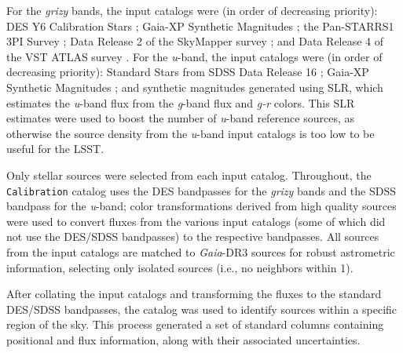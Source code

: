 For the \textit{grizy} bands, the input catalogs were (in order of decreasing priority): \gls{DES} Y6 Calibration Stars \citep{2023arXiv230501695R}; Gaia-\gls{XP} Synthetic Magnitudes \citep{2023A&A...674A..33G}; the \gls{Pan-STARRS}1 3PI Survey \citep{2016arXiv161205560C}; \gls{Data Release} 2 of the  SkyMapper survey \citep{2019PASA...36...33O}; and \gls{Data Release} 4 of the \gls{VST} \gls{ATLAS} survey \citep{2015MNRAS.451.4238S}.
For the \textit{u}-band, the input catalogs were (in order of decreasing priority): Standard Stars from \gls{SDSS} \gls{Data Release} 16 \citep{2020ApJS..249....3A}; Gaia-\gls{XP} Synthetic Magnitudes \citep{2023A&A...674A..33G}; and synthetic magnitudes generated using \gls{SLR}, which estimates the \textit{u}-band \gls{flux} from the \textit{g}-band \gls{flux} and \textit{g-r} colors.
This \gls{SLR} estimates were used to boost the number of \textit{u}-band reference sources, as otherwise the source density from the \textit{u}-band input catalogs is too low to be useful for the \gls{LSST}.

Only stellar sources were selected from each input catalog.
Throughout, the \texttt{Calibration} catalog uses the \gls{DES} bandpasses for the \textit{grizy} bands and the \gls{SDSS} bandpass for the \textit{u}-band; color transformations derived from high quality sources were used to convert fluxes from the various input catalogs (some of which did not use the \gls{DES}/SDSS bandpasses) to the respective bandpasses.
All sources from the input catalogs are matched to \textit{Gaia}-\gls{DR3} sources for robust astrometric information, selecting only isolated sources (i.e., no neighbors within 1\arcsec).

After collating the input catalogs and transforming the fluxes to the standard DES/SDSS bandpasses, the catalog was used to identify sources within a specific region of the sky.
This process generated a set of standard columns containing positional and flux information, along with their associated uncertainties.

